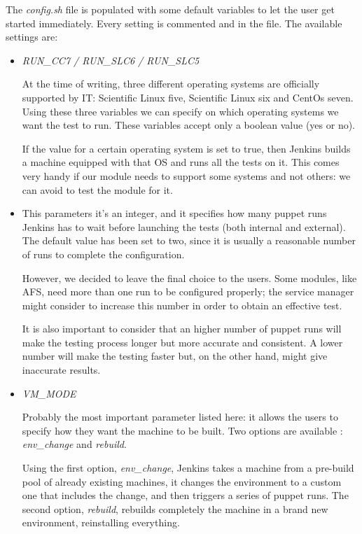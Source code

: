 The \textit{config.sh} file is populated with some default variables to
let the user get started immediately. Every setting is commented and in
the file. The available settings are:

\begin{itemize}

  \item \textit{RUN\_CC7 / RUN\_SLC6 / RUN\_SLC5}

At the time of writing, three different operating systems are officially
supported by IT: Scientific Linux five, Scientific Linux six and CentOs
seven. Using these three variables we can specify on which operating
systems we want the test to run. These variables accept only a boolean
value (yes or no).

If the value for a certain operating system is set to true, then Jenkins
builds a machine equipped with that OS and runs all the tests on it. This
comes very handy if our module needs to support some systems and not
others: we can avoid to test the module for it.

  \item {}

This parameters it's an integer, and it specifies how many puppet runs
Jenkins has to wait before launching the tests (both internal and
external). The default value has been set to two, since it is usually
a reasonable number of runs to complete the configuration.

However, we decided to leave the final choice to the users. Some modules,
like AFS, need more than one run to be configured properly; the service
manager might consider to increase this number in order to obtain an
effective test.

It is also important to consider that an higher number of puppet runs will
make the testing process longer but more accurate and consistent. A lower
number will make the testing faster but, on the other hand, might give
inaccurate results.

  \item \textit{VM\_MODE}

Probably the most important parameter listed here: it allows the users to
specify how they want the machine to be built. Two options are available
: \textit{env\_change} and \textit{rebuild}.

Using the first option, \textit{env\_change}, Jenkins takes a machine from
a pre-build pool of already existing machines, it changes the environment
to a custom one that includes the change, and then triggers a series of
puppet runs. The second option, \textit{rebuild}, rebuilds completely the
machine in a brand new environment, reinstalling everything.


\end{itemize}
